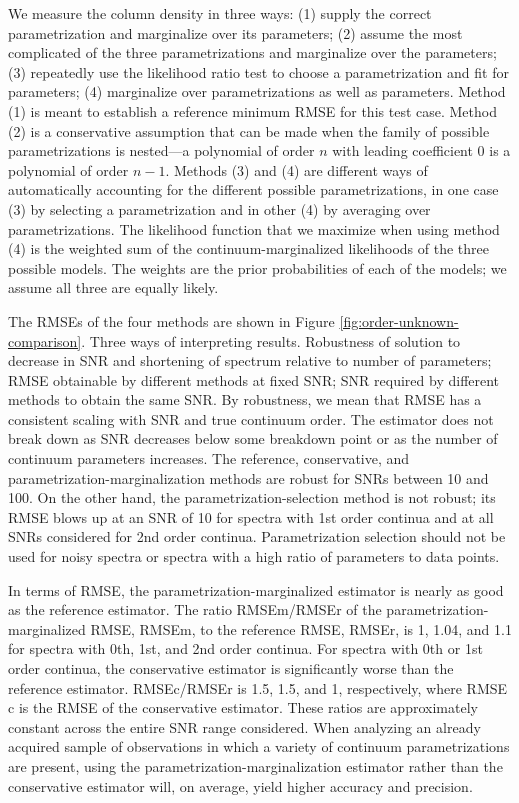 \documentclass[manuscript]{aastex62}
\begin{document}
We measure the column density in three ways: (1) supply the correct parametrization and marginalize over its parameters; (2) assume the most complicated of the three parametrizations and marginalize over the parameters; (3) repeatedly use the likelihood ratio test to choose a parametrization and fit for parameters; (4) marginalize over parametrizations as well as parameters.
Method (1) is meant to establish a reference minimum RMSE for this test case.
Method (2) is a conservative assumption that can be made when the family of possible parametrizations is nested---a polynomial of order $n$ with leading coefficient 0 is a polynomial of order $n-1$.
Methods (3) and (4) are different ways of automatically accounting for the different possible parametrizations, in one case (3) by selecting a parametrization and in other (4) by averaging over parametrizations.
The likelihood function that we maximize when using method (4) is the weighted sum of the continuum-marginalized likelihoods of the three possible models.
The weights are the prior probabilities of each of the models; we assume all three are equally likely.

The RMSEs of the four methods are shown in Figure \ref{fig:order-unknown-comparison}.
Three ways of interpreting results. Robustness of solution to decrease in SNR and shortening of spectrum relative to number of parameters; RMSE obtainable by different methods at fixed SNR; SNR required by different methods to obtain the same SNR.
 By robustness, we mean that RMSE has a consistent scaling with SNR and true continuum order.
The estimator does not break down as SNR decreases below some breakdown point or as the number of continuum parameters increases.
The reference, conservative, and parametrization-marginalization methods are robust for SNRs between 10 and 100.
On the other hand, the parametrization-selection method is not robust; its RMSE blows up at an SNR of 10 for spectra with 1st order continua and at all SNRs considered for 2nd order continua.
Parametrization selection should not be used for noisy spectra or spectra with a high ratio of parameters to data points.

In terms of RMSE, the parametrization-marginalized estimator is nearly as good as the reference estimator.
The ratio RMSE$\textrm{m}$/RMSE$\textrm{r}$ of the parametrization-marginalized RMSE, RMSE$\textrm{m}$, to the reference RMSE, RMSE$\textrm{r}$, is 1, 1.04, and 1.1 for spectra with 0th, 1st, and 2nd order continua.
For spectra with 0th or 1st order continua, the conservative estimator is significantly worse than the reference estimator.
RMSE$\textrm{c}$/RMSE$\textrm{r}$ is 1.5, 1.5, and 1, respectively, where RMSE$\textrm{c}$ is the RMSE of the conservative estimator.
These ratios are approximately constant across the entire SNR range considered.
When analyzing an already acquired sample of observations in which a variety of continuum parametrizations are present, using the parametrization-marginalization estimator rather than the conservative estimator will, on average, yield higher accuracy and precision.
\end{document}
